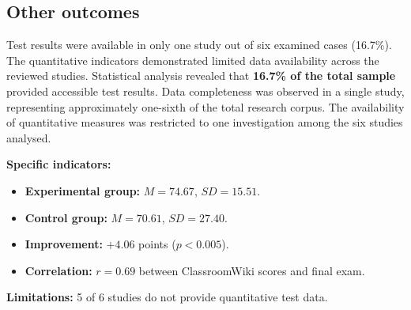 \documentclass[
hf,
]{ceurart}
\begin{document}
\subsection{Other outcomes}

Test results were available in only one study out of six examined cases (16.7\%). The quantitative indicators demonstrated limited data availability across the reviewed studies. Statistical analysis revealed that \textbf{16.7\% of the total sample} provided accessible test results. Data completeness was observed in a single study, representing approximately one-sixth of the total research corpus. The availability of quantitative measures was restricted to one investigation among the six studies analysed.

\textbf{Specific indicators:}
\begin{itemize}
    \item \textbf{Experimental group:} $M = 74.67$, $SD = 15.51$.
    \item \textbf{Control group:} $M = 70.61$, $SD = 27.40$.
    \item \textbf{Improvement:} $+4.06$ points ($p < 0.005$).
    \item \textbf{Correlation:} $r = 0.69$ between ClassroomWiki scores and final exam.
\end{itemize}

\textbf{Limitations:} 5 of 6 studies do not provide quantitative test data.


\end{document}
